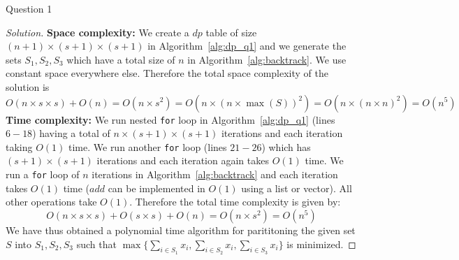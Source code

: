 \begin{solution}{Question 1}
\begin{proof}[Solution]
        \textbf{Space complexity:} We create a $dp$ table of size $(n+1)\times(s+1)\times(s+1)$ in Algorithm~\ref{alg:dp_q1} and we generate the sets $S_1, S_2, S_3$ which have a total size of $n$ in Algorithm~\ref{alg:backtrack}. We use constant space everywhere else. Therefore the total space complexity of the solution is
        \begin{equation}
            O(n\times s\times s) + O(n) = O(n\times s^2) = O(n\times {(n\times\max(S))}^2) = O(n\times {(n\times n)}^2) = O(n^5)
        \end{equation}
        \textbf{Time complexity:} We run nested \texttt{for} loop in Algorithm~\ref{alg:dp_q1} (lines $6-18$) having a total of $n\times(s+1)\times(s+1)$ iterations and each iteration taking $O(1)$ time. We run another \texttt{for} loop (lines $21-26$) which has $(s+1)\times(s+1)$ iterations and each iteration again takes $O(1)$ time. We run a \texttt{for} loop of $n$ iterations in Algorithm~\ref{alg:backtrack} and each iteration takes $O(1)$ time ($add$ can be implemented in $O(1)$
        using a list or vector). All other operations take $O(1)$. Therefore the total time complexity is given by:
        \begin{equation}
            O(n\times s\times s) + O(s\times s) + O(n) = O(n\times s^2) = O(n^5)
        \end{equation}
        We have thus obtained a polynomial time algorithm for parititoning the given set $S$ into $S_1, S_2, S_3$ such that $\max\{\sum_{i\in S_1}{x_i}, \sum_{i\in S_2}{x_i}, \sum_{i\in S_3}{x_i}\}$ is minimized.
    \end{proof}
\end{solution}
